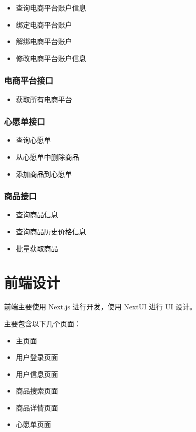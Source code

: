 \begin{itemize}
  \item 查询电商平台账户信息
  \item 绑定电商平台账户
  \item 解绑电商平台账户
  \item 修改电商平台账户信息
\end{itemize}

\subsubsection{电商平台接口}

\begin{itemize}
  \item 获取所有电商平台
\end{itemize}

\subsubsection{心愿单接口}

\begin{itemize}
  \item 查询心愿单
  \item 从心愿单中删除商品
  \item 添加商品到心愿单
\end{itemize}

\subsubsection{商品接口}

\begin{itemize}
  \item 查询商品信息
  \item 查询商品历史价格信息
  \item 批量获取商品
\end{itemize}

\section{前端设计}

前端主要使用 Next.js 进行开发，使用 NextUI 进行 UI 设计。

主要包含以下几个页面：

\begin{itemize}
  \item 主页面
  \item 用户登录页面
  \item 用户信息页面
  \item 商品搜索页面
  \item 商品详情页面
  \item 心愿单页面
\end{itemize}

